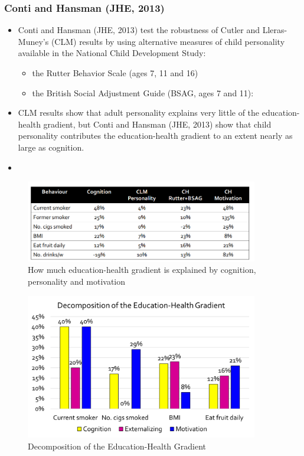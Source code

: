         \subsubsection{Conti and Hansman (JHE, 2013)}

            \begin{itemize}
                \item Conti and Hansman (JHE, 2013) test the robustness of Cutler and Lleras-Muney's (CLM) results by using alternative measures of child personality available in the National Child Development Study:
                    \begin{itemize}
                        \item the Rutter Behavior Scale (ages 7, 11 and 16)
                        \item the British Social Adjustment Guide (BSAG, ages 7 and 11):
                    \end{itemize}
                \item CLM results show that adult personality explains very little of the education-health gradient, but Conti and Hansman (JHE, 2013) show that child personality contributes the education-health gradient to an extent nearly as large as cognition. 
                \item {}
            \end{itemize}

            \begin{figure}[H]
                \centering
                \includegraphics[width=4in]{images/ch3/42.png}
                \caption{How much education-health gradient is explained by cognition, personality and motivation}
            \end{figure} 

            \begin{figure}[H]
                \centering
                \includegraphics[width=4in]{images/ch3/43.png}
                \caption{Decomposition of the Education-Health Gradient}
            \end{figure} 

